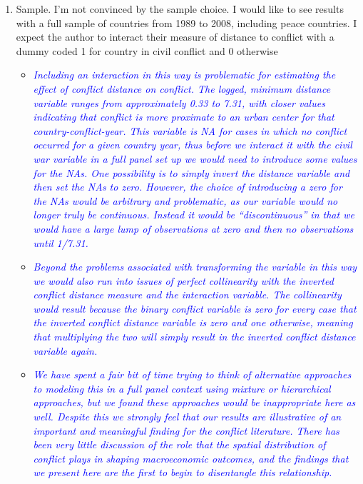 \begin{enumerate}
\item Sample. I’m not convinced by the sample choice. I would like to see results with a full sample of countries from 1989 to 2008, including peace countries. I expect the author to interact their measure of distance to conflict with a dummy coded 1 for country in civil conflict and 0 otherwise

\begin{itemize}
\item \textcolor{blue}{\emph{
	Including an interaction in this way is problematic for estimating the effect of conflict distance on conflict. The logged, minimum distance variable ranges from approximately 0.33 to 7.31, with closer values indicating that conflict is more proximate to an urban center for that country-conflict-year. This variable is NA for cases in which no conflict occurred for a given country year, thus before we interact it with the civil war variable in a full panel set up we would need to introduce some values for the NAs. One possibility is to simply invert the distance variable and then set the NAs to zero. However, the choice of introducing a zero for the NAs would be arbitrary and problematic, as our variable would no longer truly be continuous. Instead it would be ``discontinuous'' in that we would have a large lump of observations at zero and then no observations until 1/7.31.
}} 
\item \textcolor{blue}{\emph{
	Beyond the problems associated with transforming the variable in this way we would also run into issues of perfect collinearity with the inverted conflict distance measure and the interaction variable. The collinearity would result because the binary conflict variable is zero for every case that the inverted conflict distance variable is zero and one otherwise, meaning that multiplying the two will simply result in the inverted conflict distance variable again. 
}}
\item \textcolor{blue}{\emph{
	We have spent a fair bit of time trying to think of alternative approaches to modeling this in a full panel context using mixture or hierarchical approaches, but we found these approaches would be inappropriate here as well. 
	Despite this we strongly feel that our results are illustrative of an important and meaningful finding for the conflict literature. There has been very little discussion of the role that the spatial distribution of conflict plays in shaping macroeconomic outcomes, and the findings that we present here are the first to begin to disentangle this relationship.
}}
\end{itemize}


\end{enumerate}

